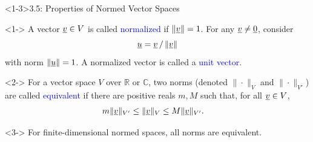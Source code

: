 \documentclass[10pt,english,aspectratio=169]{beamer}
\begin{document}
\begin{frame}<1-3>{3.5: Properties of Normed Vector Spaces}

\begin{definition}<1->
A vector $\underline{v} \in V$ is called \textcolor{blue}{normalized} if $\left\| \underline{v} \right\| = 1$.
For any $\underline{v} \neq \underline{0}$, consider \vspace{-2mm}
\begin{equation*}
\underline{u} = \underline{v}\, / \left\| \underline{v} \right\|
\end{equation*}
with norm $\left\| \underline{u} \right\| = 1$.
A normalized vector is called a \textcolor{blue}{unit vector}.
\end{definition}


\begin{definition}<2->
For a vector space $V$ over $\mathbb{R}$ or $\mathbb{C}$, two norms (denoted $\|\cdot\|_{V}$ and $\|\cdot\|_{V'}$) are called \textcolor{blue}{equivalent} if there are positive reals $m,M$ such that, for all $\underline{v} \in V$,
\begin{align*}
m \| \underline{v} \|_{V'} & \leq \| \underline{v} \|_V \leq M \| \underline{v} \|_{V'}.
\end{align*}
\end{definition}

\begin{lemma}<3->
For finite-dimensional normed spaces, all norms are equivalent.
\end{lemma}


\end{frame}
\end{document}
